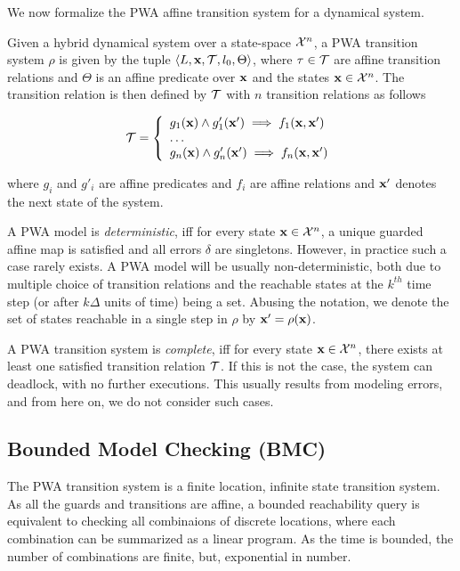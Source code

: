 We now formalize the PWA affine transition system for a dynamical system.
\begin{definition}

Given a hybrid dynamical system over a state-space
$\mathcal{X}^n$, a PWA transition system $\rho$ is given by the
tuple $\left\langle L,\mathbf{x},\mathcal{T},l_0,\Theta \right \rangle$, where $\tau \in
\mathcal{T}$ are affine transition relations and $\Theta$ is an affine
predicate over $\mathbf{x}$ and the states $\mathbf{x}\in\mathcal{X}^n$. The
transition relation is then defined by $\mathcal{T}$ with $n$ transition
relations as follows

\begin{equation}
    \mathcal{T} = \left\{
        \begin{array}{ll}
            g_1(\mathbf{x}) \land g'_1(\mathbf{x}') \implies f_1(\mathbf{x},\mathbf{x}') \\
            \ldots\\
            g_n(\mathbf{x}) \land g'_n(\mathbf{x}') \implies f_n(\mathbf{x},\mathbf{x}') \\
        \end{array}
    \right.
\end{equation}

\end{definition}

where $g_i$ and $g'_i$ are affine predicates and $f_i$ are affine
relations and $\mathbf{x}'$ denotes the next state of the system.

A PWA model is \textit{deterministic}, iff for every state
$\mathbf{x}\in\mathcal{X}^n$, a unique guarded affine map is satisfied and
all errors $\delta$ are singletons. However, in practice such a case
rarely exists. A PWA model will be usually non-deterministic, both due
to multiple choice of transition relations and the reachable states at
the $k^{th}$ time step (or after $k\Delta$ units of time) being a set.
Abusing the notation, we denote the set of states reachable in a
single step in $\rho$ by $\mathbf{x}' = \rho(\mathbf{x})$.

A PWA transition system is \textit{complete}, iff for every state
$\mathbf{x}\in\mathcal{X}^n$, there exists at least one satisfied
transition relation $\mathcal{T}$. If this is not the case, the system can
deadlock, with no further executions. This usually results from
modeling errors, and from here on, we do not consider such
cases.

\subsection{Bounded Model Checking (BMC)}
The PWA transition system is a finite location, infinite state
transition system. As all the guards and transitions are affine, a
bounded reachability query is equivalent to checking all
combinaions of discrete locations, where each combination can be
summarized as a linear program. As the time is bounded, the number of
combinations are finite, but, exponential in number.

